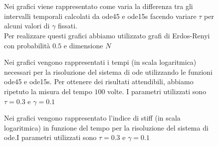 \documentclass[11pt]{article}
\begin{document}
\begin{figure}[h]
\centering
\subfloat[][$N=10$]
{\resizebox{0.45\textwidth}{!}{}}
 \hfill 
\subfloat[][$N=20$]
{\resizebox{0.45\textwidth}{!}{ }}  \\
\subfloat[][$N=30$]
{\resizebox{0.45\textwidth}{!}{}}
 \hfill 
\subfloat[][$N=40$]
{\resizebox{0.45\textwidth}{!}{ }}  \\
\subfloat[][$N=50$]
{\resizebox{0.45\textwidth}{!}{}}
 \hfill 
\subfloat[][$N=60$]
{\resizebox{0.45\textwidth}{!}{ }} 
\caption{Nei grafici viene rappresentato come varia la differenza tra gli intervalli temporali calcolati da ode45 e ode15s facendo variare $\tau$ per alcuni valori di $\gamma$ fissati.\\
Per realizzare questi grafici abbiamo utilizzato grafi di Erdos-Renyi con probabilit\`a $0.5$  e dimensione $N$}
\label{Erdos_Lenght}

\end{figure}
\begin{figure}
	\centering
 
 \caption{Nei grafici vengono  rappresentati i tempi (in scala logaritmica) necessari per la risoluzione del sistema di ode  utilizzando le funzioni ode45 e ode15s.  Per ottenere dei risultati attendibili,  abbiamo ripetuto la misura del tempo $100$ volte.  I parametri utilizzati sono $\tau =0.3$ e $\gamma =0.1$}
 \label{Erdos_tempo}
\end{figure}

\begin{figure}
\centering

\caption{Nei grafici vengono  rappresentato l'indice di stiff (in scala logaritmica) in funzione del tempo  per la risoluzione del sistema di ode.I parametri utilizzati sono $\tau =0.3$ e $\gamma =0.1$}
 \label{stiff_soluzione}
\end{figure}
\end{document}
